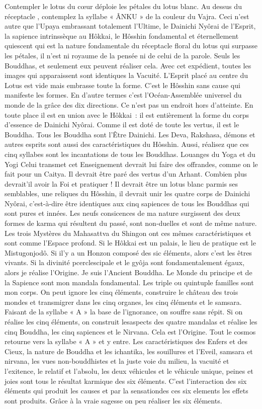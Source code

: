 Contempler le lotus du cœur déploie les pétales du lotus blanc.  Au dessus du réceptacle , contemplez la syllabe « ÂNKU » de la couleur du Vajra. Ceci n'est autre que l'Upaya embrassant totalement l'Ultime, le Dainichi Nyôrai de l'Esprit, la sapience intrinssèque au Hôkkai, le Hôsshin fondamental et éternellement quiescent qui est la nature fondamentale du réceptacle floral du lotus qui surpasse les pétales, il n’est ni royaume de la pensée ni de celui de la parole. Seuls les Bouddhas, et seulement eux peuvent réaliser cela.
Avec cet expédient, toutes les images qui apparaissent sont identiques la Vacuité. L'Esprit placé au centre du Lotus est vide mais embrasse toute la forme. C’est le Hôsshin sans cause qui manifeste les formes.  En d’autre termes c’est l’Océan-Assemblée universel du monde de la grâce des dix directions. Ce n’est pas un endroit hors d’atteinte. En toute place il est en union avec le Hôkkai : il est entièrement la forme du corps d’essence de Dainichi Nyôrai. Comme il est doté de toute les vertus, il est le Bouddha.
Tous les Bouddha sont l’Être Dainichi. Les Deva, Rakshasa, démons et autres esprits sont aussi des caractéristiques du Hôsshin. Aussi, réalisez que ces cinq syllabes sont les incantations de tous les Bouddhas.
Louanges du Yoga et du Yogi
Celui transmet cet Enseignement devrait lui faire des offrandes, comme on le fait pour un Caitya. Il devrait être paré des vertus d’un Arhant. Combien plus devrait’il avoir la Foi et pratiquer ! Il devrait être un lotus blanc parmis ses semblables, une reliques du Hôsshin, il devrait unir les quatre corps de Dainichi Nyôrai, c'est-à-dire être identiques aux cinq sapiences de tous les Bouddhas qui sont pures et innées.
Les neufs consicences de ma nature surgissent des deux formes de karma qui résultent du passé, sont non-duelles et sont de même nature. Les trois Mystères du Mahasattva du Shingon ont ces mêmes caractéristiques et sont comme l’Espace profond. Si le Hôkkai est un palais, le lieu de pratique est le Mistugonjodô. Si il’y a un Honzon composé des sic éléments, alors c’est les êtres vivants. Si la divinité pcerclescipale et le gyôja sont fondamentalement égaux, alors je réalise l’Origine. Je suis l’Ancient Bouddha. Le Monde du principe et de la Sapience sont mon mandala fondamental. Les triple ou quintuple familles sont mon corps.
On peut ignore les cinq éléments, construire le château des trois mondes et transmigrer dans les cinq organes, les cinq éléments et le samsara. Faisant de la syllabe « A » la base de l’ignorance, on souffre sans répit. Si on réalise les cinq éléments, on construit lesaspects des quatre mandalas et réalise les cinq Bouddha, les cinq sapiences et le Nirvana. Cela est l’Origine. Tout le cosmos retourne vers la syllabe « A » et y entre. Les caractéristiques des Enfers et des Cieux, la nature de Bouddha et les ichantika, les souillures et l’Eveil, samsara et nirvana, les vues non-bouddhistes et la juste voie du milieu, la vacuité et l’exitence, le relatif et l’absolu, les deux véhicules et le véhicule unique, peines et joies sont tous le résultat karmique des six éléments. C’est l’interaction des six éléments qui produit les causes et par la sensationdes ces six elements les effets sont produits. Grâce à la vraie sagesse on peu réaliser les six éléments.
